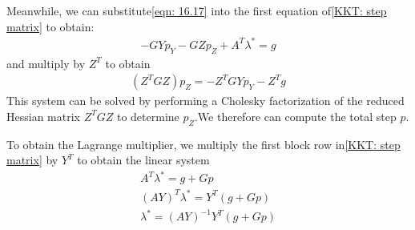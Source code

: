     Meanwhile, we can substitute\eqref{eqn: 16.17} into the first equation of\eqref{KKT: step matrix} to obtain:
    \begin{align}
        -GYp_Y - GZp_Z + A^T\lambda^* = g
    \end{align}
    and multiply by $Z^T$ to obtain
    \begin{align}
        (Z^T GZ)p_{Z} = -Z^T GYp_Y - Z^T g
    \end{align}
    This system can be solved by performing a Cholesky factorization of the reduced Hessian matrix $Z^TGZ$
    to determine $p_Z$.We therefore can compute the total step $p$.
    \par To obtain the Lagrange multiplier, we multiply the first block row in\eqref{KKT: step matrix} by $Y^T$
    to obtain the linear system
    \begin{align*}
        A^T\lambda^* = g + Gp \\
        (AY)^T\lambda^* = Y^T(g + Gp) \tag{16.20}\label{eqn: 16.20}\\
        \lambda^* = (AY)^{-1}Y^T(g + Gp)
    \end{align*}